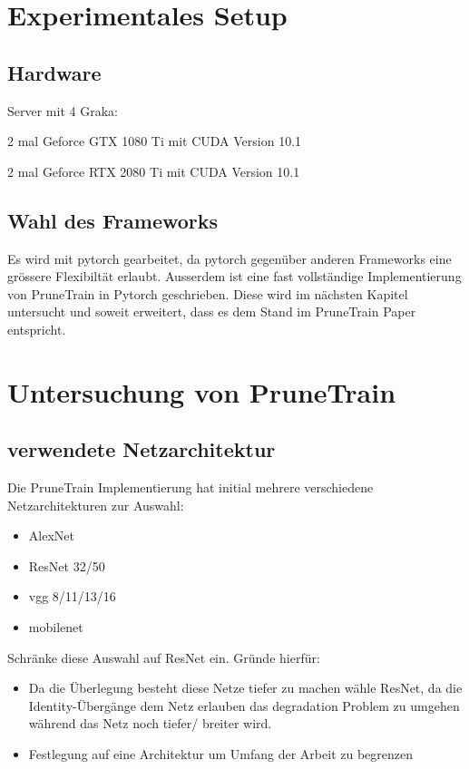 \section{Experimentales Setup}


\subsection{Hardware}
Server mit 4 Graka:

2 mal Geforce GTX 1080 Ti mit CUDA Version 10.1 

2 mal Geforce RTX 2080 Ti mit CUDA Version 10.1

\subsection{Wahl des Frameworks}

Es wird mit pytorch gearbeitet, da pytorch gegenüber anderen Frameworks eine grössere Flexibiltät erlaubt. Ausserdem ist eine fast vollständige Implementierung von PruneTrain in Pytorch geschrieben. Diese wird im nächsten Kapitel untersucht und soweit erweitert, dass es dem Stand im PruneTrain Paper entspricht.



\section{Untersuchung von PruneTrain}


\subsection{verwendete Netzarchitektur}\label{sec:archi}
Die PruneTrain Implementierung hat initial mehrere verschiedene Netzarchitekturen zur Auswahl:
\begin{itemize}
 \item AlexNet
 \item ResNet 32/50
 \item vgg 8/11/13/16
 \item mobilenet
\end{itemize}

Schränke diese Auswahl auf ResNet ein.
Gründe hierfür:
\begin{itemize}
 \item Da die Überlegung besteht diese Netze tiefer zu machen wähle ResNet, da die Identity-Übergänge dem Netz erlauben das degradation Problem zu umgehen während das Netz noch tiefer/ breiter wird.
 \item Festlegung auf eine Architektur um Umfang der Arbeit zu begrenzen
\end{itemize}

